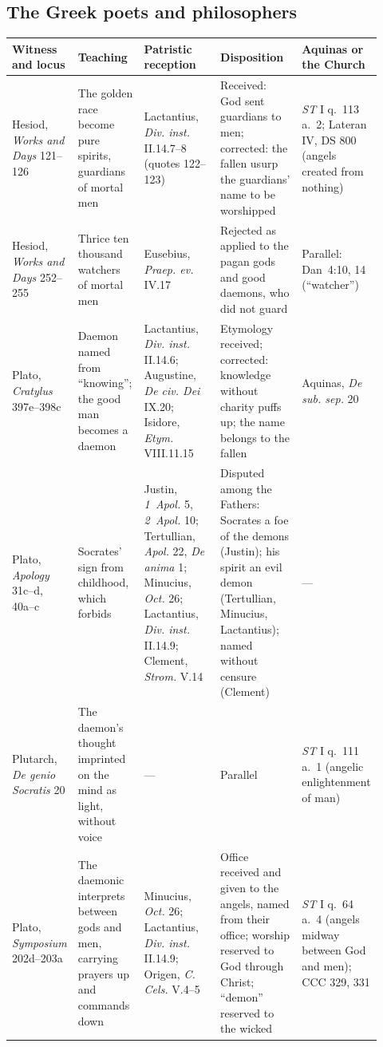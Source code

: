 \subsection*{The Greek poets and philosophers}
\begingroup\footnotesize
\begin{longtable}{>{\raggedright\arraybackslash}p{0.15\linewidth}>{\raggedright\arraybackslash}p{0.18\linewidth}>{\raggedright\arraybackslash}p{0.22\linewidth}>{\raggedright\arraybackslash}p{0.23\linewidth}>{\raggedright\arraybackslash}p{0.14\linewidth}}
\toprule
\textbf{Witness and locus} & \textbf{Teaching} & \textbf{Patristic reception} & \textbf{Disposition} & \textbf{Aquinas or the Church}\\
\midrule
\endhead
\bottomrule
\endfoot
Hesiod, \emph{Works and Days} 121--126 & The golden race become pure spirits, guardians of mortal men & Lactantius, \emph{Div. inst.} II.14.7--8 (quotes 122--123) & Received: God sent guardians to men; corrected: the fallen usurp the guardians' name to be worshipped & \emph{ST} I q.~113 a.~2; Lateran IV, DS 800 (angels created from nothing)\\
Hesiod, \emph{Works and Days} 252--255 & Thrice ten thousand watchers of mortal men & Eusebius, \emph{Praep. ev.} IV.17 & Rejected as applied to the pagan gods and good daemons, who did not guard & Parallel: Dan~4:10, 14 (``watcher'')\\
Plato, \emph{Cratylus} 397e--398c & Daemon named from ``knowing''; the good man becomes a daemon & Lactantius, \emph{Div. inst.} II.14.6; Augustine, \emph{De civ. Dei} IX.20; Isidore, \emph{Etym.} VIII.11.15 & Etymology received; corrected: knowledge without charity puffs up; the name belongs to the fallen & Aquinas, \emph{De sub. sep.} 20\\
Plato, \emph{Apology} 31c--d, 40a--c & Socrates' sign from childhood, which forbids & Justin, \emph{1~Apol.} 5, \emph{2~Apol.} 10; Tertullian, \emph{Apol.} 22, \emph{De anima} 1; Minucius, \emph{Oct.} 26; Lactantius, \emph{Div. inst.} II.14.9; Clement, \emph{Strom.} V.14 & Disputed among the Fathers: Socrates a foe of the demons (Justin); his spirit an evil demon (Tertullian, Minucius, Lactantius); named without censure (Clement) & ---\\
Plutarch, \emph{De genio Socratis} 20 & The daemon's thought imprinted on the mind as light, without voice & --- & Parallel & \emph{ST} I q.~111 a.~1 (angelic enlightenment of man)\\
Plato, \emph{Symposium} 202d--203a & The daemonic interprets between gods and men, carrying prayers up and commands down & Minucius, \emph{Oct.} 26; Lactantius, \emph{Div. inst.} II.14.9; Origen, \emph{C. Cels.} V.4--5 & Office received and given to the angels, named from their office; worship reserved to God through Christ; ``demon'' reserved to the wicked & \emph{ST} I q.~64 a.~4 (angels midway between God and men); CCC 329, 331\\

\end{longtable}
